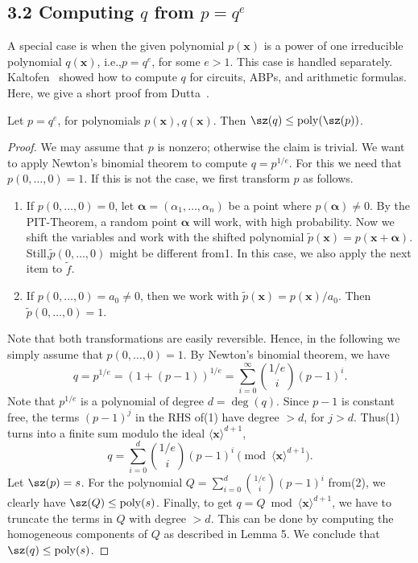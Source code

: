 \subsection*{3.2 Computing $q$ from $p=q^e$}
A special case is when the given polynomial $p(\mathbf x)$ is a power of one irreducible polynomial $q(\mathbf x)$, i.e.,$p=q^e$, for some $e>1$. This case is handled separately. Kaltofen~\cite{ref10} showed how to compute $q$ for circuits, ABPs, and arithmetic formulas. Here, we give a short proof from Dutta~\cite{ref5}.
\begin{ntlemma}
Let $p=q^e$, for polynomials $p(\mathbf x),q(\mathbf x)$. Then $\sz(q)\leq\operatorname{poly}(\sz(p))$.
\end{ntlemma}
\begin{proof}
We may assume that $p$ is nonzero; otherwise the claim is trivial. We want to apply Newton's binomial theorem to compute $q=p^{1/e}$. For this we need that $p(0,\ldots,0)=1$. If this is not the case, we first transform $p$ as follows.
\begin{enumerate}\item If $p(0,\ldots,0)=0$, let $\boldsymbol\alpha=(\alpha_1,\ldots,\alpha_n)$ be a point where $p(\boldsymbol\alpha)\ne0$. By the PIT-Theorem, a random point $\boldsymbol\alpha$ will work, with high probability. Now we shift the variables and work with the shifted polynomial $\widetilde p(\mathbf x)=p(\mathbf x+\boldsymbol\alpha)$. Still,$\widetilde p(0,\ldots,0)$ might be different from1. In this case, we also apply the next item to $\widetilde f$.\item If $p(0,\ldots,0)=a_0\ne0$, then we work with $\widetilde p(\mathbf x)=p(\mathbf x)/a_0$. Then $\widetilde p(0,\ldots,0)=1$.\end{enumerate}
Note that both transformations are easily reversible. Hence, in the following we simply assume that $p(0,\ldots,0)=1$.
By Newton's binomial theorem, we have
\begin{equation}q=p^{1/e}=(1+(p-1))^{1/e}=\sum_{i=0}^\infty\binom{1/e}i(p-1)^i.\tag{1}\end{equation}
Note that $p^{1/e}$ is a polynomial of degree $d=\deg(q)$. Since $p-1$ is constant free, the terms $(p-1)^j$ in the RHS of(1) have degree $>d$, for $j>d$. Thus(1) turns into a finite sum modulo the ideal $\langle\mathbf x\rangle^{d+1}$,
\begin{equation}q=\sum_{i=0}^d\binom{1/e}i(p-1)^i\pmod{\langle\mathbf x\rangle^{d+1}}.\tag{2}\end{equation}
Let $\sz(p)=s$. For the polynomial $Q=\sum_{i=0}^d\binom{1/e}i(p-1)^i$ from(2), we clearly have $\sz(Q)\leq\operatorname{poly}(s)$. Finally, to get $q=Q\bmod\langle\mathbf x\rangle^{d+1}$, we have to truncate the terms in $Q$ with degree $>d$. This can be done by computing the homogeneous components of $Q$ as described in Lemma 5. We conclude that $\sz(q)\leq\operatorname{poly}(s)$.
\end{proof}
